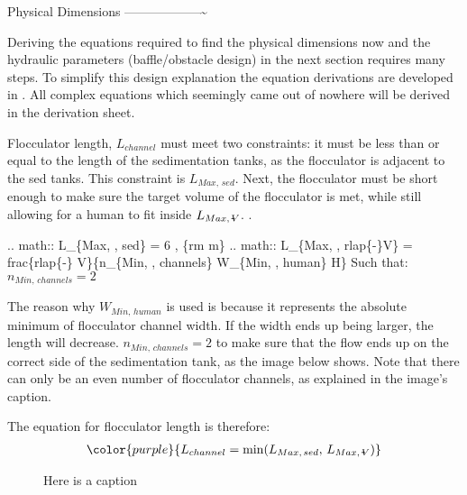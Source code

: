 \documentclass[letterpaper,10pt,english]{sphinxmanual}
\let\sphinxpxdimen\pdfpxdimen\else\newdimen\sphinxpxdimen
\begin{document}
Physical Dimensions
——————\textasciitilde{}

Deriving the equations required to find the physical dimensions now and the hydraulic parameters (baffle/obstacle design) in the next section requires many steps. To simplify this design explanation the equation derivations are developed in {\hyperref[\detokenize{Review/Review_Fluid_Mechanics_Derivations:title-review-fluid-mechanics-derivations}]{}}. All complex equations which seemingly came out of nowhere will be derived in the derivation sheet.


Flocculator length, \(L_{channel}\) must meet two constraints: it must be less than or equal to the length of the sedimentation tanks, as the flocculator is adjacent to the sed tanks. This constraint is \(L_{Max, \, sed}\). Next, the flocculator must be short enough to make sure the target volume of the flocculator is met, while still allowing for a human to fit inside \(L_{Max, \, \rlap{-} V}\). .

\begin{DUlineblock}{0em}
\item[] .. math:: L\_\{Max, , sed\} = 6 , \{rm m\}
.. math:: L\_\{Max, , rlap\{-\}V\} = frac\{rlap\{-\} V\}\{n\_\{Min, , channels\} W\_\{Min, , human\} H\}
Such that:
\(n_{Min, \, channels} = 2\)
\end{DUlineblock}

The reason why \(W_{Min, \, human}\) is used is because it represents the absolute minimum of flocculator channel width. If the width ends up being larger, the length will decrease. \(n_{Min, \, channels} = 2\) to make sure that the flow ends up on the correct side of the sedimentation tank, as the image below shows. Note that there can only be an even number of flocculator channels, as explained in the image’s caption.

The equation for  flocculator length is therefore:
\begin{equation}\label{equation:Flocculation/Floc_Design:Flocculation/Floc_Design:25}
\begin{split}\color{purple}{
  L_{channel} = {\rm min}(L_{Max, \, sed}, \, L_{Max, \, \rlap{-} V})
  }\end{split}
\end{equation}
\begin{figure}[htbp]
\centering
\capstart

\noindent\sphinxincludegraphics[width=400\sphinxpxdimen]{{Floc_channels}.jpg}
\caption{Here is a caption}\label{\detokenize{Flocculation/Floc_Design:id9}}\label{\detokenize{Flocculation/Floc_Design:figure-floc-channels}}\end{figure}
\end{document}
